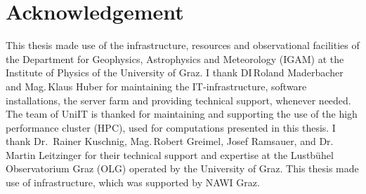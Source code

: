 %
\chapter*{Acknowledgement}
\label{sec:acknowledgement}
\vspace*{-10mm}

This thesis made use of the infrastructure, resources and observational facilities of the Department for Geophysics, Astrophysics and Meteorology (IGAM) at the Institute of Physics of the University of Graz. 
I thank DI\,Roland Maderbacher and Mag.\,Klaus Huber for maintaining the IT-infrastructure, software installations, the server farm and providing technical support, whenever needed. The team of UniIT is thanked for maintaining and supporting the use of the high performance cluster (HPC), used for computations presented in this thesis.
I thank Dr.\, Rainer Kuschnig, Mag.\,Robert Greimel, Josef Ramsauer, and Dr.\, Martin Leitzinger for their technical support and expertise at the Lustbühel Observatorium Graz (OLG) operated by the University of Graz. 
This thesis made use of infrastructure, which was supported by NAWI Graz. 


